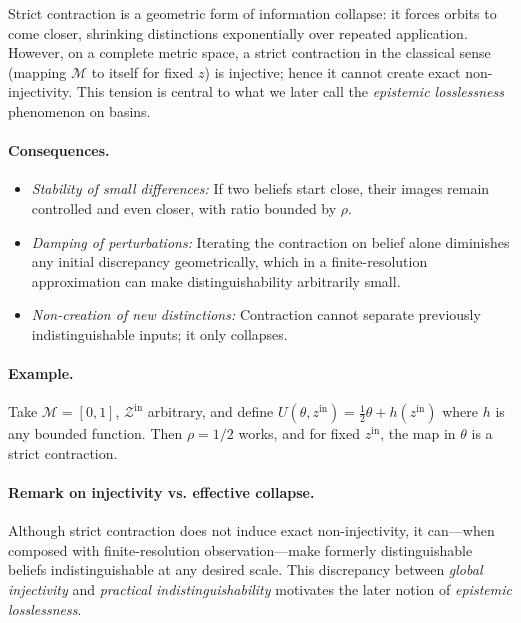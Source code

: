 \documentclass[12pt]{article}
\theoremstyle{definition}
\theoremstyle{plain}
\begin{document}
Strict contraction is a geometric form of information collapse: it forces orbits to come closer, shrinking distinctions exponentially over repeated application.  However, on a complete metric space, a strict contraction in the classical sense (mapping \(\mathcal{M}\) to itself for fixed \(z\)) is injective; hence it cannot create exact non-injectivity.  This tension is central to what we later call the \emph{epistemic losslessness} phenomenon on basins.

\paragraph{Consequences.}  
\begin{itemize}
    \item \emph{Stability of small differences:} If two beliefs start close, their images remain controlled and even closer, with ratio bounded by \(\rho\).  
    \item \emph{Damping of perturbations:} Iterating the contraction on belief alone diminishes any initial discrepancy geometrically, which in a finite-resolution approximation can make distinguishability arbitrarily small.  
    \item \emph{Non-creation of new distinctions:} Contraction cannot separate previously indistinguishable inputs; it only collapses.
\end{itemize}

\paragraph{Example.} Take \(\mathcal{M}=[0,1]\), \(\mathcal{Z}^{\mathrm{in}}\) arbitrary, and define \(U(\theta,z^{\mathrm{in}})=\frac{1}{2}\theta + h(z^{\mathrm{in}})\) where \(h\) is any bounded function. Then \(\rho=1/2\) works, and for fixed \(z^{\mathrm{in}}\), the map in \(\theta\) is a strict contraction.

\paragraph{Remark on injectivity vs. effective collapse.} Although strict contraction does not induce exact non-injectivity, it can—when composed with finite-resolution observation—make formerly distinguishable beliefs indistinguishable at any desired scale.  This discrepancy between \emph{global injectivity} and \emph{practical indistinguishability} motivates the later notion of \emph{epistemic losslessness}.  
\end{document}
